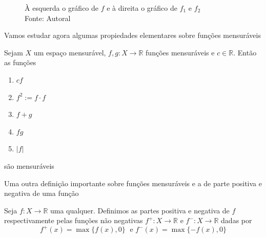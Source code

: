 \documentclass[a4paper, 11pt]{book}
\theoremstyle{definition}
\newcommand{\bR}{\mathbb{R}}
\begin{document}
\begin{ex}
\begin{figure}
        \caption{À esquerda o gráfico de $f$ e à direita o gráfico de $f_1$ e $f_2$\\Fonte: Autoral}
        \label{fig:truncagem}
    \end{figure}
\end{ex}

Vamos estudar agora algumas propiedades elementares sobre funções mensuráveis

\begin{pbox}
    Sejam $X$ um espaço mensurável, $f, g : X \to \bR$ funções mensuráveis e $c \in \bR$. Então as funções
    \begin{enumerate}[leftmargin=*, label=\textbf{(\alph*)}]
        \item $cf$
        \item $f^2 := f \cdot f$
        \item $f + g$
        \item $fg$
        \item $|f|$
    \end{enumerate}
    são mensuráveis
\end{pbox}
\begin{prf}
    
\end{prf}

Uma outra definição importante sobre funções mensuráveis e a de parte positiva e negativa de uma função
\begin{dbox}
    Seja $f : X \to \bR$ uma qualquer.
    Definimos as partes positiva e negativa de $f$ respectivamente pelas funções não negativas $f^+ : X \to \bR$ e $f^- : X \to \bR$ dadas por
    \[
        f^+(x) = \max\{f(x), 0\} \;\text{ e } f^-(x) = \max\{-f(x), 0\}
    \]
\end{dbox}
\end{document}
